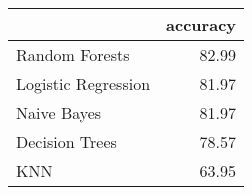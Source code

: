 \begin{tabular}{lr}
\toprule
{} &  accuracy \\
\midrule
Random Forests      &     82.99 \\
Logistic Regression &     81.97 \\
Naive Bayes         &     81.97 \\
Decision Trees      &     78.57 \\
KNN                 &     63.95 \\
\bottomrule
\end{tabular}

